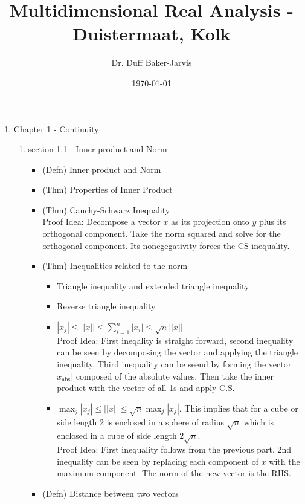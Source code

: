 \documentclass[12pt]{article}
\theoremstyle{definition}
\newcommand{\ds}{\displaystyle}
\begin{document}
\title{Multidimensional Real Analysis - Duistermaat, Kolk}
\date{\today}
\author{Dr. Duff Baker-Jarvis}
\maketitle

\begin{enumerate}
    \item Chapter 1 - Continuity
    \begin{enumerate}
	\item section 1.1 - Inner product and Norm
	    \begin{itemize}
	    \item (Defn) Inner product and Norm
	    \item (Thm) Properties of Inner Product
	    \item (Thm) Cauchy-Schwarz Inequality\\
		Proof Idea: Decompose a vector $ x $ as its projection onto $ y $ plus its orthogonal component. Take the norm squared and solve for the orthogonal component. Its nonegegativity forces the CS inequality.
	    \item (Thm) Inequalities related to the norm
		\begin{itemize}
		    \item Triangle inequality and extended triangle inequality
		    \item Reverse triangle inequality
		    \item $ \ds |x_j|\leq ||x|| \leq \sum_{i=1}^{n} |x_i| \leq \sqrt{n}||x||  $\\
			Proof Idea: First ineqality is straight forward, second inequality can be seen by decomposing the vector and applying the triangle inequality. Third inequality can be seend by forming the vector $ x_{\text{abs}}| $ composed of the absolute values. Then take the inner product with the vector of all 1s and apply C.S.
		    \item $ \max_{j}|x_j| \leq ||x|| \leq \sqrt{n} \max_{j} |x_j|$. This implies that for a cube or side length 2 is enclosed in a sphere of radius $ \sqrt{n} $ which is enclosed in a cube of side length $ 2\sqrt{n} $.\\
			Proof Idea: First inequality follows from the previous part. 2nd inequality can be seen by replacing each component of $ x $ with the maximum component. The norm of the new vector is the RHS.
		\end{itemize}
	    \item (Defn) Distance between two vectors

\end{itemize}
\end{enumerate}
\end{enumerate}
\end{document}
